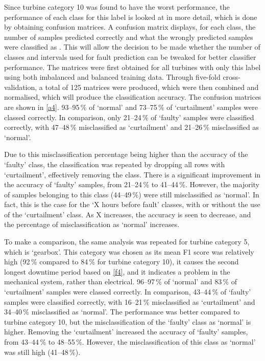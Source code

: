 Since turbine category 10 was found to have the worst performance, the
performance of each class for this label is looked at in more detail, which is
done by obtaining confusion matrices. A confusion matrix displays, for each
class, the number of samples predicted correctly and what the wrongly
predicted samples were classified as \cite{33M}. This will allow the decision
to be made whether the number of classes and intervals used for fault
prediction can be tweaked for better classifier performance. The matrices were
first obtained for all turbines with only this label using both imbalanced and
balanced training data. Through five-fold cross-validation, a total of 125
matrices were produced, which were then combined and normalised, which will
produce the classification accuracy. The confusion matrices are shown in
\autoref{a4}. 93--95\,\% of `normal' and 73--75\,\% of `curtailment' samples
were classed correctly. In comparison, only 21--24\,\% of `faulty' samples were
classified correctly, with 47--48\,\% misclassified as `curtailment' and
21--26\,\% misclassified as `normal'.

Due to this misclassification percentage being higher than the accuracy of the
`faulty' class, the classification was repeated by dropping all rows with
`curtailment', effectively removing the class. There is a significant
improvement in the accuracy of `faulty' samples, from 21--24\,\% to 41--44\,\%.
However, the majority of samples belonging to this class (44--49\,\%) were
still misclassified as `normal'. In fact, this is the case for the `X hours
before fault' classes, with or without the use of the `curtailment' class. As
X increases, the accuracy is seen to decrease, and the percentage of
misclassification as `normal' increases.

To make a comparison, the same analysis was repeated for turbine category 5,
which is `gearbox'. This category was chosen as its mean F1 score was
relatively high (92\,\% compared to 84\,\% for turbine category 10), it causes
the second longest downtime period based on \autoref{f4}, and it indicates a
problem in the mechanical system, rather than electrical. 96--97\,\% of
`normal' and 83\,\% of `curtailment' samples were classed correctly. In
comparison, 43--44\,\% of `faulty' samples were classified correctly, with
16--21\,\% misclassified as `curtailment' and 34--40\,\% misclassified as
`normal'. The performance was better compared to turbine category 10, but the
misclassification of the `faulty' class as `normal' is higher. Removing the
`curtailment' increased the accuracy of `faulty' samples, from 43--44\,\% to
48--55\,\%. However, the misclassification of this class as `normal' was still
high (41--48\,\%).


